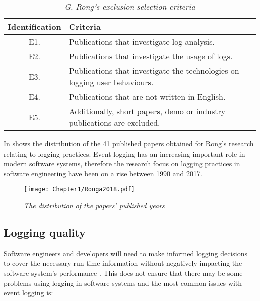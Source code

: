 \begin{table}[!htb]
	\centering
	\small
	\caption[G. Rong's exclusion selection criteria]
	{\textit{G. Rong's exclusion selection criteria \cite{Rong2018a}}}
	\label{tbl:CH1_RongExlSelectionCriteria}
	\begin{tabularx}{\textwidth}{|c|X|}
		\hline \textbf{Identification} & \textbf{Criteria} \\
		\hline E1. & Publications that investigate log analysis. \\
		\hline E2. & Publications that investigate the usage of logs. \\
		\hline E3. & Publications that investigate the technologies on logging user behaviours. \\
		\hline E4. & Publications that are not written in English. \\
		\hline E5. & Additionally, short papers, demo or industry publications are excluded. \\
		\hline
	\end{tabularx}
\end{table}

In  shows the distribution of the 41 published papers obtained for Rong's research relating to logging practices. Event logging has an increasing important role in modern software systems, therefore the research focus on logging practices in software engineering have been on a rise between 1990 and 2017.

\begin{figure}[!htb] %
	\centering %
	\texttt{[image: Chapter1/Ronga2018.pdf]}
	\caption[The distribution of the papers’ published years]
	{\textit{The distribution of the papers’ published years \cite{Rong2018a}}} \label{fig:PushblisedPapers}
\end{figure} 

\subsection{Logging quality}

Software engineers and developers will need to make informed logging decisions to cover the necessary run-time information without negatively impacting the software system's performance \cite{Zhu2015,Zhu2019,Kherbouche2017}. This does not ensure that there may be some problems using logging in software systems and the most common issues with event logging is:

